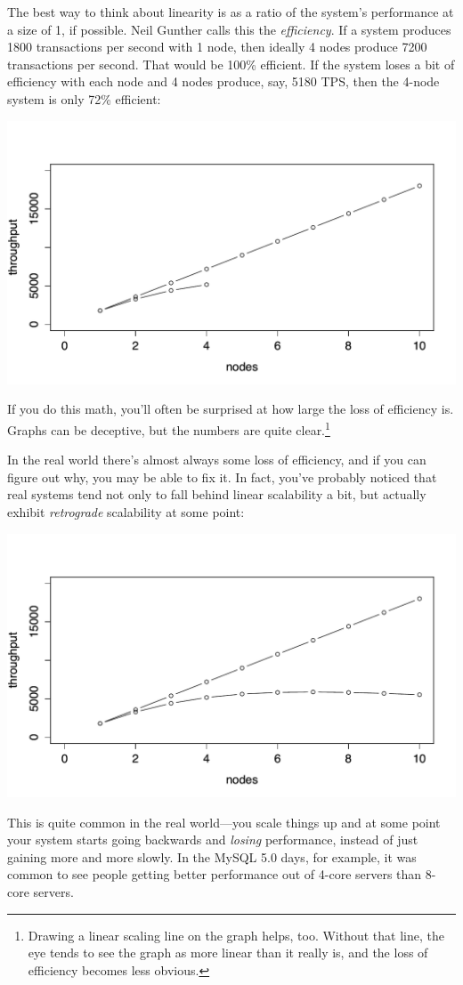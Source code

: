 \documentclass{vivid_layout}
\begin{document}
The best way to think about linearity is as a ratio of the system's performance
at a size of 1, if possible. Neil Gunther calls this the {\itshape efficiency}.
If a system produces 1800 transactions per second with 1 node, then ideally 4
nodes produce 7200 transactions per second. That would be 100\% efficient. If
the system loses a bit of efficiency with each node and 4 nodes produce, say,
5180 TPS, then the 4-node system is only 72\% efficient:
\begin{center}
\includegraphics[width=.85\linewidth]{scalability/linear2}
\end{center}
If you do this math, you'll often be surprised at how large the loss of
efficiency is.  Graphs can be deceptive, but the numbers are quite
clear.\footnote{Drawing a linear scaling line on the graph helps, too. Without
that line, the eye tends to see the graph as more linear than it really is, and
the loss of efficiency becomes less obvious.}


In the real world there's almost always some loss of efficiency, and if you can
figure out why, you may be able to fix it. In fact, you've probably noticed that
real systems tend not only to fall behind linear scalability a bit, but actually
exhibit {\itshape retrograde} scalability at some point:
\begin{center}
\includegraphics[width=.85\linewidth]{scalability/linear3}
\end{center}
This is quite common in the real world---you scale things up and at some point
your system starts going backwards and {\itshape losing} performance, instead of
just gaining more and more slowly. In the MySQL 5.0 days, for example, it was
common to see people getting better performance out of 4-core servers than
8-core servers.
\end{document}
